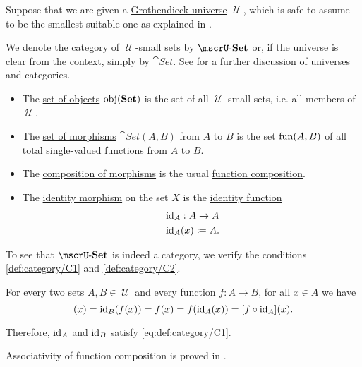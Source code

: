 \begin{definition}\label{def:category_of_small_sets}
  Suppose that we are given a \hyperref[def:grothendieck_universe]{Grothendieck universe} \( \mscrU \), which is safe to assume to be the smallest suitable one as explained in .

  We denote the \hyperref[def:category]{category} of \( \mscrU \)-small \hyperref[def:set]{sets} by \( \ucat{Set} \) or, if the universe is clear from the context, simply by \( \cat{Set} \). See  for a further discussion of universes and categories.

  \begin{itemize}
    \item The \hyperref[def:category/objects]{set of objects} \( \operatorname{obj}(\operatorname{\mathbf{Set}}) \) is the set of all \( \mscrU \)-small sets, i.e. all members of \( \mscrU \).

    \item The \hyperref[def:category/morphisms]{set of morphisms} \( \cat{Set}(A, B) \) from \( A \) to \( B \) is the set \hyperref[def:function/set_of_functions]{\( \operatorname{fun}(A, B) \)} of all total single-valued functions from \( A \) to \( B \).

    \item The \hyperref[def:category/composition]{composition of morphisms} is the usual \hyperref[def:multi_valued_function/composition]{function composition}.

    \item The \hyperref[def:category/identity]{identity morphism} on the set \( X \) is the \hyperref[def:multi_valued_function/identity]{identity function}
    \begin{equation*}
      \begin{aligned}
        &\operatorname{id}_A: A \to A \\
        &\operatorname{id}_A(x) \coloneqq A.
      \end{aligned}
    \end{equation*}
  \end{itemize}
\end{definition}
\begin{defproof}
  To see that \( \ucat{Set} \) is indeed a category, we verify the conditions \ref{def:category/C1} and \ref{def:category/C2}.

   For every two sets \( A, B \in \mscrU \) and every function \( f: A \to B \), for all \( x \in A \) we have
  \begin{equation*}
    [\id_B \bincirc f](x)
    =
    \id_B(f(x))
    =
    f(x)
    =
    f(\id_A(x))
    =
    [f \bincirc \id_A](x).
  \end{equation*}

  Therefore, \( \operatorname{id}_A \) and \( \operatorname{id}_B \) satisfy \eqref{eq:def:category/C1}.

   Associativity of function composition is proved in .
\end{defproof}

